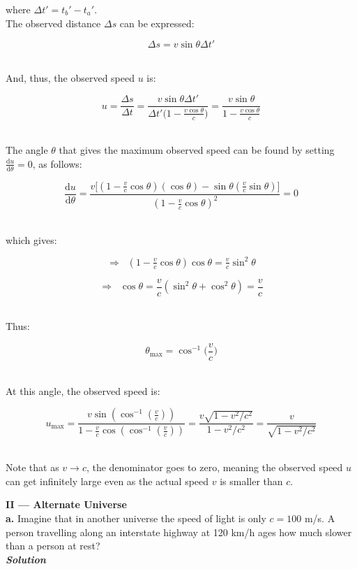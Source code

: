 \documentclass[9pt]{extarticle}
\newcommand{\bfit}[1]{\textbf{\textit{#1}}}
\renewcommand{\d}{\text{d}}
\renewcommand{\dd}[2]{\frac{\d #1}{\d #2}}
\begin{document}
\begin{multicols*}{2}
where $\Delta t' = t_b' - t_a'$. \\

The observed distance $\Delta s$ can be expressed:

$$\Delta s = v\sin\theta \Delta t'$$ \ 

And, thus, the observed speed $u$ is:

$$u = \frac{\Delta s}{\Delta t} = \frac{v\sin\theta \Delta t'}{\Delta t' \big( 1 - \frac{v\cos\theta}{c} \big)} = \frac{v\sin\theta}{1-\frac{v\cos\theta}{c}}$$ \ 

The angle $\theta$ that gives the maximum observed speed can be found by setting $\dd u \theta = 0$, as follows:

$$\dd u \theta = \frac{v \big[ (1-\tfrac vc \cos\theta)(\cos\theta) - \sin\theta(\tfrac vc \sin\theta) \big]}{(1-\tfrac vc \cos\theta)^2} = 0$$ \ 

which gives:

$$\Longrightarrow \;\; (1-\tfrac vc \cos\theta)\cos\theta = \tfrac vc \sin^2\theta$$

$$\Longrightarrow \;\; \cos\theta = \frac vc (\sin^2\theta + \cos^2\theta) = \frac vc$$ \ 

Thus:

$$\theta_{\text{max}} = \cos^{-1} \bigg(\frac vc \bigg)$$ \ 

At this angle, the observed speed is:

$$u_{\text{max}} = \frac{v\sin(\cos^{-1}(\tfrac vc))}{1-\tfrac vc \cos(\cos^{-1}(\tfrac vc))} = \frac{v\sqrt{1-v^2/c^2}}{1-v^2/c^2} = \frac{v}{\sqrt{1-v^2/c^2}}$$ \ 

Note that as $v \rightarrow c$, the denominator goes to zero, meaning the observed speed $u$ can get infinitely large even as the actual speed $v$ is smaller than $c$. \\ 







\hrulefill 

\hfill 

{\LARGE \bf II --- Alternate Universe} \\ 

{\Large \bf a.} Imagine that in another universe the speed of light is only $c=100$ m/s. A person travelling along an interstate highway at 120 km/h ages how much slower than a person at rest? \\ 

{\bfit{Solution}} \\ 


\end{multicols*}
\end{document}
